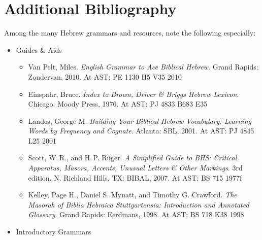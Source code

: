 \documentclass[titlepage]{article}
\newcommand\policy{../policy}
\begin{document}



\section{Additional Bibliography}
\label{bibliography}

Among the many Hebrew grammars and resources, note the following
especially:

\begin{itemize}
  \item Guides \& Aids

    \begin{itemize}
      \item
        Van Pelt, Miles. \emph{English Grammar to Ace Biblical Hebrew}.
        Grand Rapids: Zondervan, 2010. At AST: PE 1130 H5 V35 2010
      \item
        Einspahr, Bruce. \emph{Index to Brown, Driver \& Briggs Hebrew Lexicon}.
        Chicago: Moody Press, 1976. At AST: PJ 4833 B683 E35
      \item
        Landes, George M. \emph{Building Your Biblical Hebrew
        Vocabulary: Learning Words by Frequency and Cognate}.
        Atlanta: SBL, 2001. At AST: PJ 4845 L25 2001
      \item
        Scott, W.\,R., and H.\,P. Rüger. \emph{A Simplified Guide to BHS:
        Critical Apparatus, Masora, Accents, Unusual Letters \& Other
        Markings}. 3rd edition. N. Richland Hills, TX: BIBAL, 2007.
        At AST: BS 715 1977f
      \item
        Kelley, Page H., Daniel S. Mynatt, and Timothy G. Crawford.
        \emph{The Masorah of Biblia Hebraica Stuttgartensia:
        Introduction and Annotated Glossary}.
        Grand Rapids: Eerdmans, 1998. At AST: BS 718 K38 1998
    \end{itemize}

  \item Introductory Grammars


\end{itemize}
\end{document}
